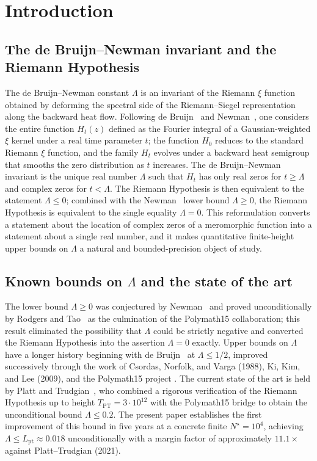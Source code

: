 \documentclass[11pt,a4paper]{article}
\theoremstyle{definition}
\newcommand{\Hflow}{H_t}
\newcommand{\Tpt}{T_{\mathrm{PT}}}
\newcommand{\Lpt}{L_{\mathrm{pt}}}
\newcommand{\Nstar}{N^{\!\star}}
\begin{document}
\section{Introduction}\label{sec:intro}

\subsection{The de Bruijn--Newman invariant and the Riemann Hypothesis}

The de Bruijn--Newman constant $\Lambda$ is an invariant of the Riemann
$\xi$ function obtained by deforming the spectral side of the
Riemann--Siegel representation along the backward heat flow.
Following de Bruijn~\cite{deBruijn1950} and
Newman~\cite{Newman1976}, one considers the entire function $\Hflow(z)$
defined as the Fourier integral of a Gaussian-weighted $\xi$ kernel under
a real time parameter $t$; the function $H_0$ reduces to the standard
Riemann $\xi$ function, and the family $\Hflow$ evolves under a backward
heat semigroup that smooths the zero distribution as $t$ increases.
The de Bruijn--Newman invariant is the unique real number $\Lambda$ such
that $\Hflow$ has only real zeros for $t \ge \Lambda$ and complex zeros
for $t < \Lambda$. The Riemann Hypothesis is then equivalent to the
statement $\Lambda \le 0$; combined with the
Newman~\cite{Newman1976} lower bound $\Lambda \ge 0$, the Riemann
Hypothesis is equivalent to the single equality $\Lambda = 0$. This
reformulation converts a statement about the location of complex zeros
of a meromorphic function into a statement about a single real number,
and it makes quantitative finite-height upper bounds on $\Lambda$ a
natural and bounded-precision object of study.

\subsection{Known bounds on $\Lambda$ and the state of the art}

The lower bound $\Lambda \ge 0$ was conjectured by
Newman~\cite{Newman1976} and proved unconditionally by Rodgers and
Tao~\cite{RodgersTao2020} as the culmination of the Polymath15
collaboration; this result eliminated the possibility that $\Lambda$
could be strictly negative and converted the Riemann Hypothesis into the
assertion $\Lambda = 0$ exactly. Upper bounds on $\Lambda$ have a longer
history beginning with de Bruijn~\cite{deBruijn1950} at $\Lambda \le
1/2$, improved successively through the work of Csordas, Norfolk, and
Varga (1988), Ki, Kim, and Lee (2009), and the Polymath15 project
\cite{Polymath15_2018}. The current state of the art is held by Platt
and Trudgian~\cite{PlattTrudgian2021}, who combined a rigorous
verification of the Riemann Hypothesis up to height $\Tpt = 3 \cdot
10^{12}$ with the Polymath15 bridge to obtain the unconditional bound
$\Lambda \le 0.2$. The present paper establishes the first improvement
of this bound in five years at a concrete finite $\Nstar = 10^{4}$,
achieving $\Lambda \le \Lpt \approx 0.018$ unconditionally with a margin
factor of approximately $11.1\times$ against Platt--Trudgian (2021).
\end{document}
